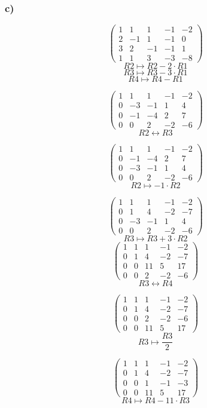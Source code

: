 \documentclass[10pt,a4paper]{article}
\begin{document}
\subsubsection*{c)}
\[
\begin{pmatrix}
1 & 1 & 1 &-1&-2\\
2 & -1 & 1 & -1 & 0\\
3 & 2 & -1 & -1 & 1\\
1 & 1 & 3 & -3 & -8
\end{pmatrix}
\]
\[ R2 \longmapsto R2 - 2\cdot R1\]
\[ R3 \longmapsto R3 - 3\cdot R1\]
\[ R4 \longmapsto R4 - R1\]

\[
\begin{pmatrix}
1 & 1 & 1 & -1 & -2\\
0 & -3 & -1 & 1 & 4\\
0 & -1 & -4 & 2 & 7\\
0 & 0 & 2 & -2 & -6
\end{pmatrix}
\]
\[ R2 \leftrightarrow R3\]

\[
\begin{pmatrix}
1 & 1 & 1 & -1 & -2\\
0 & -1 & -4 & 2 & 7\\
0 & -3 & -1 & 1 & 4\\
0 & 0 & 2 & -2 & -6
\end{pmatrix}
\]
\[ R2 \longmapsto  -1\cdot R2\]

\[
\begin{pmatrix}
1 & 1 & 1 & -1 & -2\\
0 & 1 & 4 & -2 & -7\\
0 & -3 & -1 & 1 & 4\\
0 & 0 & 2 & -2 & -6
\end{pmatrix}
\]
\[ R3 \longmapsto R3 + 3\cdot R2\]
\[
\begin{pmatrix}
1 & 1 & 1 & -1 & -2\\
0 & 1 & 4 & -2 & -7\\
0 & 0 & 11 & 5 & 17\\
0 & 0 & 2 & -2 & -6
\end{pmatrix}
\]
\[ R3 \leftrightarrow R4\]

\[
\begin{pmatrix}
1 & 1 & 1 & -1 & -2\\
0 & 1 & 4 & -2 & -7\\
0 & 0 & 2 & -2 & -6\\
0 & 0 & 11 & 5 & 17
\end{pmatrix}
\]
\[ R3 \longmapsto  \frac{R3}{2}
\]

\[
\begin{pmatrix}
1 & 1 & 1 & -1 & -2\\
0 & 1 & 4 & -2 & -7\\
0 & 0 & 1 & -1 & -3\\
0 & 0 & 11 & 5 & 17
\end{pmatrix}
\]
\[ R4 \longmapsto R4 - 11\cdot R3\]
\end{document}
